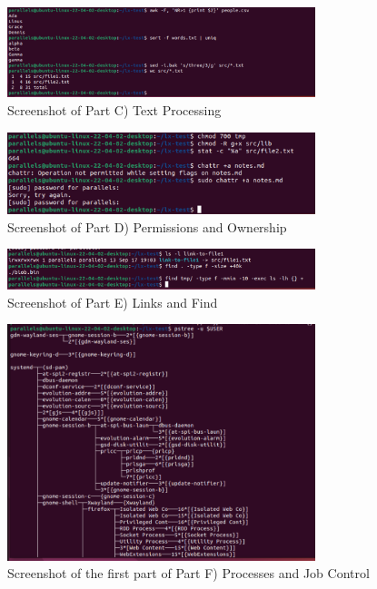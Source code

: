 \begin{figure}[h!]
    \centering
    \includegraphics[width=0.8\textwidth]{linuxptC.png}
    \caption{Screenshot of Part C) Text Processing}
    \label{fig:problemsetC}
\end{figure}

\begin{figure}[h!]
    \centering
    \includegraphics[width=0.8\textwidth]{linuxptD.png}
    \caption{Screenshot of Part D) Permissions and Ownership}
    \label{fig:problemsetD}
\end{figure}

\begin{figure}[h!]
    \centering
    \includegraphics[width=0.8\textwidth]{linuxptE.png}
    \caption{Screenshot of Part E) Links and Find}
    \label{fig:problemsetE}
\end{figure}

\begin{figure}[h!]
    \centering
    \includegraphics[width=0.8\textwidth]{linuxptF.png}
    \caption{Screenshot of the first part of Part F) Processes and Job Control}
    \label{fig:problemsetF}
\end{figure}

